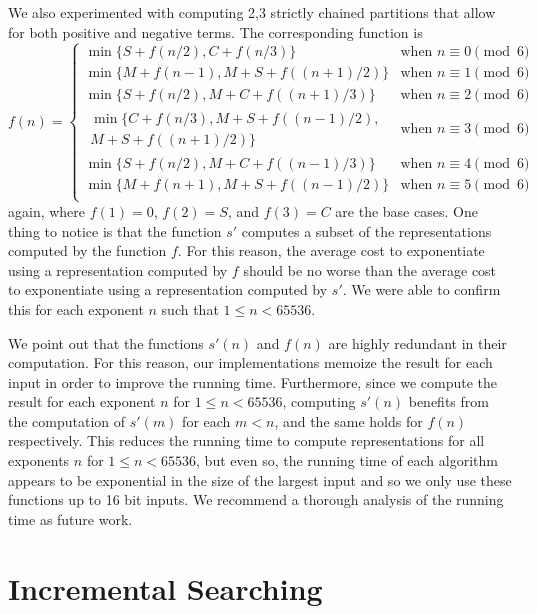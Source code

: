 \documentclass{ucalgthes1}
\theoremstyle{definition}
\begin{document}
We also experimented with computing 2,3 strictly chained partitions that allow for both positive and negative terms.  The corresponding function is
\begin{equation*}
f(n) = \begin{cases}
	\min\{S + f(n/2), C + f(n/3)\} & \textrm{when } n \equiv 0 \pmod 6 \\
	\min\{M + f(n-1), M + S + f((n+1)/2)\} & \textrm{when } n \equiv 1 \pmod 6 \\
	\min\{S + f(n/2), M + C + f((n+1)/3)\} & \textrm{when } n \equiv 2 \pmod 6 \\
	\begin{split}\min\{C + f(n/3), M + S + f((n-1)/2),\\M + S + f((n+1)/2)\}\end{split} & \textrm{when } n \equiv 3 \pmod 6 \\
	\min\{S + f(n/2), M + C + f((n-1)/3)\} & \textrm{when } n \equiv 4 \pmod 6 \\
	\min\{M + f(n+1), M + S + f((n-1)/2)\} & \textrm{when } n \equiv 5 \pmod 6 \\
\end{cases}
\end{equation*}
again, where $f(1) = 0$, $f(2) = S$, and $f(3) = C$ are the base cases.  One thing to notice is that the function $s'$ computes a subset of the representations computed by the function $f$.  For this reason, the average cost to exponentiate using a representation computed by $f$ should be no worse than the average cost to exponentiate using a representation computed by $s'$.  We were able to confirm this for each exponent $n$ such that $1 \le n < 65536$.

We point out that the functions $s'(n)$ and $f(n)$ are highly redundant in their computation.  For this reason, our implementations memoize the result for each input in order to improve the running time.  Furthermore, since we compute the result for each exponent $n$ for $1 \le n < 65536$, computing $s'(n)$ benefits from the computation of $s'(m)$ for each $m < n$, and the same holds for $f(n)$ respectively.  This reduces the running time to compute representations for all exponents $n$ for $1 \le n < 65536$, but even so, the running time of each algorithm appears to be exponential in the size of the largest input and so we only use these functions up to 16 bit inputs.  We recommend a thorough analysis of the running time as future work.


\section{Incremental Searching}
\label{sec:expIncrSearch}
\end{document}
